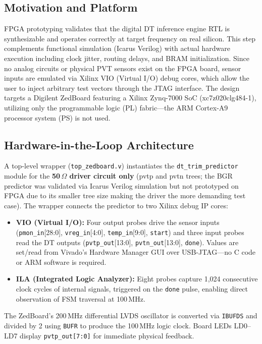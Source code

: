 \documentclass[lettersize,journal]{IEEEtran}
\begin{document}
\subsection{Motivation and Platform}
FPGA prototyping validates that the digital DT inference engine RTL is synthesizable and operates correctly at target frequency on real silicon. This step complements functional simulation (Icarus Verilog) with actual hardware execution including clock jitter, routing delays, and BRAM initialization. Since no analog circuits or physical PVT sensors exist on the FPGA board, sensor inputs are emulated via Xilinx VIO (Virtual I/O) debug cores, which allow the user to inject arbitrary test vectors through the JTAG interface. The design targets a Digilent ZedBoard featuring a Xilinx Zynq-7000 SoC (xc7z020clg484-1), utilizing only the programmable logic (PL) fabric---the ARM Cortex-A9 processor system (PS) is not used.

\subsection{Hardware-in-the-Loop Architecture}
A top-level wrapper (\texttt{top\_zedboard.v}) instantiates the \texttt{dt\_trim\_predictor} module for the \textbf{50\,$\Omega$ driver circuit only} (pvtp and pvtn trees; the BGR predictor was validated via Icarus Verilog simulation but not prototyped on FPGA due to its smaller tree size making the driver the more demanding test case). The wrapper connects the predictor to two Xilinx debug IP cores:
\begin{itemize}
\item \textbf{VIO (Virtual I/O):} Four output probes drive the sensor inputs (\texttt{pmon\_in}[28:0], \texttt{vreg\_in}[4:0], \texttt{temp\_in}[9:0], \texttt{start}) and three input probes read the DT outputs (\texttt{pvtp\_out}[13:0], \texttt{pvtn\_out}[13:0], \texttt{done}). Values are set/read from Vivado's Hardware Manager GUI over USB-JTAG---no C code or ARM software is required.
\item \textbf{ILA (Integrated Logic Analyzer):} Eight probes capture 1,024 consecutive clock cycles of internal signals, triggered on the \texttt{done} pulse, enabling direct observation of FSM traversal at 100\,MHz.
\end{itemize}

The ZedBoard's 200\,MHz differential LVDS oscillator is converted via \texttt{IBUFDS} and divided by 2 using \texttt{BUFR} to produce the 100\,MHz logic clock. Board LEDs LD0--LD7 display \texttt{pvtp\_out[7:0]} for immediate physical feedback.
\end{document}
